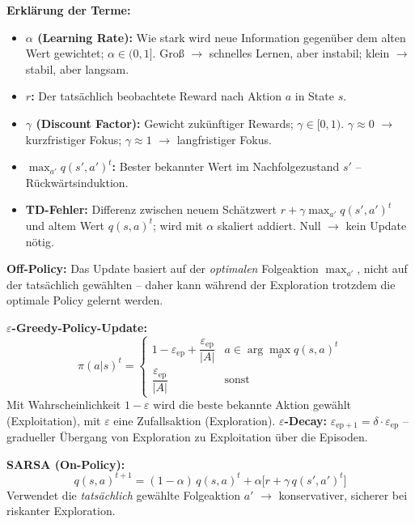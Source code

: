 \textbf{Erklärung der Terme:}
\begin{itemize}[leftmargin=1.5em]
    \item \textbf{$\alpha$ (Learning Rate):} Wie stark wird neue Information gegenüber dem alten Wert gewichtet; $\alpha \in (0,1]$. Groß $\to$ schnelles Lernen, aber instabil; klein $\to$ stabil, aber langsam.
    \item \textbf{$r$:} Der tatsächlich beobachtete Reward nach Aktion $a$ in State $s$.
    \item \textbf{$\gamma$ (Discount Factor):} Gewicht zukünftiger Rewards; $\gamma \in [0,1)$. $\gamma \approx 0$ $\to$ kurzfristiger Fokus; $\gamma \approx 1$ $\to$ langfristiger Fokus.
    \item \textbf{$\max_{a'} q(s',a')^t$:} Bester bekannter Wert im Nachfolgezustand $s'$ -- Rückwärtsinduktion.
    \item \textbf{TD-Fehler:} Differenz zwischen neuem Schätzwert $r + \gamma\max_{a'} q(s',a')^t$ und altem Wert $q(s,a)^t$; wird mit $\alpha$ skaliert addiert. Null $\to$ kein Update nötig.
\end{itemize}

\textbf{Off-Policy:} Das Update basiert auf der \emph{optimalen} Folgeaktion $\max_{a'}$, nicht auf der tatsächlich gewählten -- daher kann während der Exploration trotzdem die optimale Policy gelernt werden.

\textbf{$\varepsilon$-Greedy-Policy-Update:}
\[
\pi(a|s)^t = \begin{cases} 1 - \varepsilon_\text{ep} + \dfrac{\varepsilon_\text{ep}}{|A|} & a \in \arg\max_a q(s,a)^t \\[6pt] \dfrac{\varepsilon_\text{ep}}{|A|} & \text{sonst} \end{cases}
\]
Mit Wahrscheinlichkeit $1-\varepsilon$ wird die beste bekannte Aktion gewählt (Exploitation), mit $\varepsilon$ eine Zufallsaktion (Exploration). \textbf{$\varepsilon$-Decay:} $\varepsilon_{\text{ep}+1} = \delta \cdot \varepsilon_\text{ep}$ -- gradueller Übergang von Exploration zu Exploitation über die Episoden.

\textbf{SARSA (On-Policy):}
\[
q(s,a)^{t+1} = (1-\alpha)\,q(s,a)^t + \alpha\bigl[r + \gamma\,q(s',a')^t\bigr]
\]
Verwendet die \emph{tatsächlich} gewählte Folgeaktion $a'$ $\to$ konservativer, sicherer bei riskanter Exploration.

